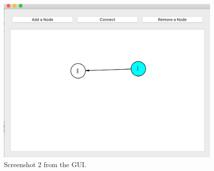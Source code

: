 \begin{figure}[!htbp]
\begin{center}
	\includegraphics[width=13cm]{Screenshot 2020-08-27 at 14.03.42.png}
    \caption{Screenshot 2 from the GUI.}
	\label{img:gui-2}			%
\end{center}
\end{figure}

